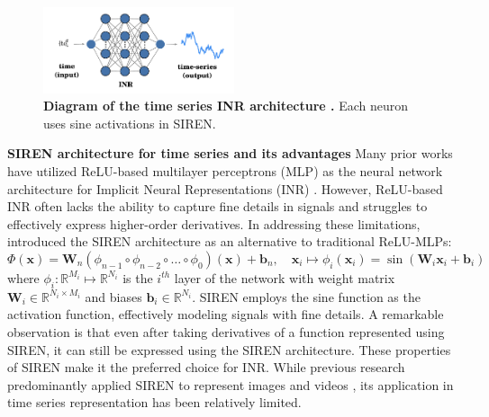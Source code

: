 \documentclass{article}
\begin{document}
\begin{figure}[htb]
  \centering
  \includegraphics[width=0.5\textwidth]{INR.png}
  \caption{\textbf{Diagram of the time series INR architecture \cite{fons2022hypertime} .}  Each neuron uses sine activations in SIREN.}
  \label{INR}
\end{figure}

\textbf{SIREN architecture for time series and its advantages}
Many prior works have utilized ReLU-based multilayer perceptrons (MLP) as the neural network architecture for Implicit Neural Representations (INR) \cite{genova2019learning,park2019deepsdf}. 
However, ReLU-based INR often lacks the ability to capture fine details in signals and struggles to effectively express higher-order derivatives.
In addressing these limitations, \cite{sitzmann2020implicit} introduced the SIREN architecture as an alternative to traditional ReLU-MLPs:
$$
\Phi(\mathbf{x})=\mathbf{W}_n\left(\phi_{n-1} \circ \phi_{n-2} \circ \ldots \circ \phi_0\right)(\mathbf{x})+\mathbf{b}_n, \quad \mathbf{x}_i \mapsto \phi_i\left(\mathbf{x}_i\right)=\sin \left(\mathbf{W}_i \mathbf{x}_i+\mathbf{b}_i\right)
$$
where $\phi_i: \mathbb{R}^{M_i} \mapsto \mathbb{R}^{N_i}$ is the $i^{t h}$ layer of the network with weight matrix $\mathbf{W}_i \in \mathbb{R}^{N_i \times M_i}$ and biases $\mathbf{b}_i \in \mathbb{R}^{N_i}$.
SIREN employs the sine function as the activation function, effectively modeling signals with fine details.
A remarkable observation is that even after taking derivatives of a function represented using SIREN, 
it can still be expressed using the SIREN architecture. 
These properties of SIREN make it the preferred choice for INR.
While previous research predominantly applied SIREN to represent images and videos \cite{lee2021meta}, its application in time series representation has been relatively limited.
\end{document}
